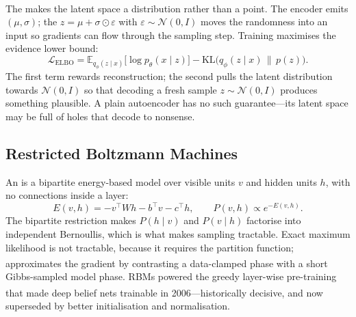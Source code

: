 The  makes the latent space a distribution
rather than a point\textsuperscript{\cite{kingmaAutoEncodingVariationalBayes2014}}.
The encoder emits $(\mu,\sigma)$; the 
$z = \mu + \sigma\odot\varepsilon$ with $\varepsilon\sim\mathcal{N}(0,I)$ moves
the randomness into an input so gradients can flow through the sampling step.
Training maximises the evidence lower bound:
\begin{equation}
  \mathcal{L}_{\text{ELBO}}
  = \mathbb{E}_{q_\phi(z\mid x)}\bigl[\log p_\theta(x\mid z)\bigr]
  - \mathrm{KL}\bigl(q_\phi(z\mid x)\,\|\,p(z)\bigr).
  \label{eq:dl-elbo}
\end{equation}
The first term rewards reconstruction; the second pulls the latent distribution
towards $\mathcal{N}(0,I)$ so that decoding a fresh sample $z\sim\mathcal{N}(0,I)$
produces something plausible. A plain autoencoder has no such guarantee---its
latent space may be full of holes that decode to nonsense.

\subsection{Restricted Boltzmann Machines}

An  is a bipartite energy-based model over visible units $v$ and
hidden units $h$, with no connections inside a layer:
\begin{equation}
  E(v,h) = -v^{\!\top}Wh - b^{\!\top}v - c^{\!\top}h,
  \qquad P(v,h)\propto e^{-E(v,h)} .
  \label{eq:dl-rbm}
\end{equation}
The bipartite restriction makes $P(h\mid v)$ and $P(v\mid h)$ factorise into
independent Bernoullis, which is what makes sampling tractable. Exact maximum
likelihood is not tractable, because it requires the partition function;
 approximates the
gradient\textsuperscript{\cite[][]{Kriesel2007NeuralNetworks}} by contrasting a
data-clamped phase with a short Gibbs-sampled model phase. RBMs powered the
greedy layer-wise pre-training that made deep belief nets trainable in
2006\textsuperscript{\cite{hintonFastLearningAlgorithm2006}}---historically
decisive, and now superseded by better initialisation and normalisation.

